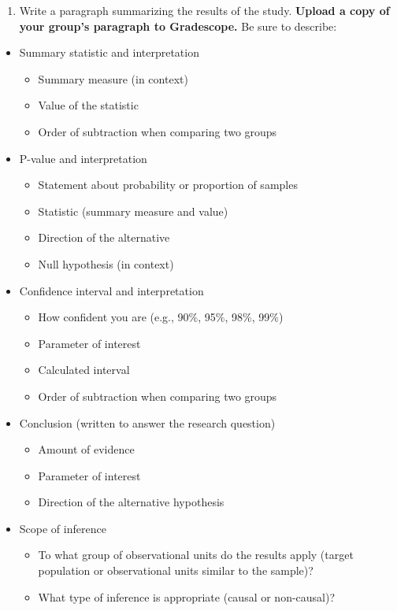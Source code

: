 \documentclass[
]{report}
\providecommand{\tightlist}{%
  \setlength{\itemsep}{0pt}\setlength{\parskip}{0pt}}
\begin{document}
\newpage

\begin{enumerate}
\def\labelenumi{\arabic{enumi}.}
\setcounter{enumi}{13}
\tightlist
\item
  Write a paragraph summarizing the results of the study. \textbf{Upload a copy of your group's paragraph to Gradescope.} Be sure to describe:
\end{enumerate}

\begin{itemize}
\item
  Summary statistic and interpretation

  \begin{itemize}
  \item
    Summary measure (in context)
  \item
    Value of the statistic
  \item
    Order of subtraction when comparing two groups
  \end{itemize}
\item
  P-value and interpretation

  \begin{itemize}
  \item
    Statement about probability or proportion of samples
  \item
    Statistic (summary measure and value)
  \item
    Direction of the alternative
  \item
    Null hypothesis (in context)
  \end{itemize}
\item
  Confidence interval and interpretation

  \begin{itemize}
  \item
    How confident you are (e.g., 90\%, 95\%, 98\%, 99\%)
  \item
    Parameter of interest
  \item
    Calculated interval
  \item
    Order of subtraction when comparing two groups
  \end{itemize}
\item
  Conclusion (written to answer the research question)

  \begin{itemize}
  \item
    Amount of evidence
  \item
    Parameter of interest
  \item
    Direction of the alternative hypothesis
  \end{itemize}
\item
  Scope of inference

  \begin{itemize}
  \item
    To what group of observational units do the results apply (target population or observational units similar to the sample)?
  \item
    What type of inference is appropriate (causal or non-causal)?
  \end{itemize}
\end{itemize}
\end{document}
